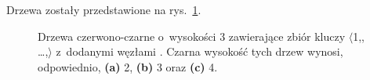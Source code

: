 
\exercise %
Drzewa zostały przedstawione na rys.\ \ref{fig:13.1-1}.
\begin{figure}[ht]
	\centering 
	\caption{Drzewa czerwono-czarne o~wysokości 3 zawierające zbiór kluczy $\langle$1,,\! \dots,$\rangle$ z~dodanymi węzłami .
	Czarna wysokość tych drzew wynosi, odpowiednio, {\sffamily\bfseries(a)} 2, {\sffamily\bfseries(b)} 3 oraz {\sffamily\bfseries(c)} 4.} \label{fig:13.1-1}
\end{figure}

\exercise %
\exercise %
\exercise %
\exercise %
\exercise %
\exercise %
